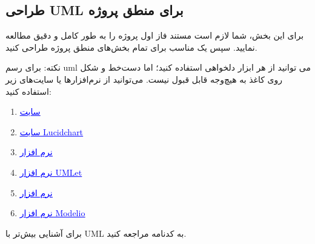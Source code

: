 \documentclass[]{article}
\begin{document}
\newpage
\subsection*{{\titr طراحی UML برای منطق پروژه}}
\label{subsec:uml}

برای این بخش، شما لازم است مستند فاز اول پروژه را به طور کامل و دقیق مطالعه نمایید. سپس یک  مناسب برای تمام بخش‌های منطق پروژه طراحی کنید.

نکته: برای رسم uml می توانید از هر ابزار دلخواهی استفاده کنید؛ اما دست‌خط و شکل روی کاغذ به هیچ‌وجه قابل قبول نیست. می‌توانید از نرم‌افزارها یا سایت‌های زیر استفاده کنید:

\begin{enumerate}
	
	\item
	
	\href{https://app.diagrams.net/}{\textcolor{blue}{\underline{سایت }}} 
	
	\item
	
	\href{https://www.lucidchart.com/pages/}{\textcolor{blue}{\underline{سایت Lucidchart}}} 
	
	
	\item
	
	\href{https://products.office.com/en/visio/flowchart-software}{\textcolor{blue}{\underline{نرم افزار }}} 
	
	
	\item
	
	\href{https://www.umlet.com/changes.htm}{\textcolor{blue}{\underline{نرم افزار UMLet}}} 
	
	
	\item
	
	\href{https://online.visual-paradigm.com/}{\textcolor{blue}{\underline{نرم افزار }}} 
	
	
	\item
	
	\href{https://www.modelio.org/}{\textcolor{blue}{\underline{نرم افزار Modelio}}} 
	
	

	
	
	
\end{enumerate}


برای آشنایی بیش‌تر با UML به کدنامه مراجعه کنید.
\end{document}
